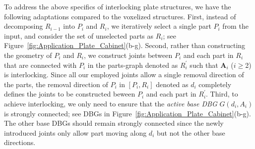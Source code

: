 To address the above specifics of interlocking plate structures, we have the following adaptations compared to the voxelized structures.
First, instead of decomposing $R_{i-1}$ into $P_i$ and $R_i$, we iteratively select a single part $P_i$  from the input, and consider the set of unselected parts as $R_i$; see Figure~\ref{fig:Application_Plate_Cabinet}(b-g).
Second, rather than constructing the geometry of $P_i$ and $R_i$, we construct joints between $P_i$ and each part in $R_i$ that are connected with $P_i$ in the parts-graph denoted as $R_i^{'}$ such that $\mathbf{A}_i$ ($i\geq$2) is interlocking.
Since all our employed joints allow a single removal direction of the parts, the removal direction of $P_i$ in $[P_i, R_i]$ denoted as $d_i$ completely defines the joints to be constructed beween $P_i$ and each part in $R_i^{'}$.
Third, to achieve interlocking, we only need to ensure that the {\em active base DBG} $G(d_i, A_i)$ is strongly connected; see DBGs in Figure~\ref{fig:Application_Plate_Cabinet}(b-g).
The other base DBGs should remain strongly connected since the newly introduced joints only allow part moving along $d_i$ but not the other base directions.

